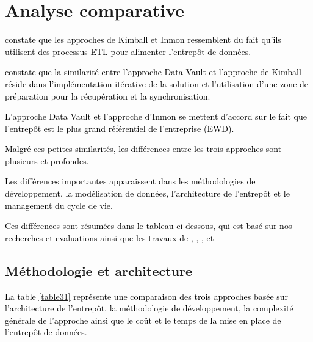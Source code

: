 \documentclass[a4paper,12pt]{report}
\begin{document}
\section{Analyse comparative}
\textcolor{black}{\citep{breslin2004data} constate que les approches de Kimball et Inmon ressemblent du fait qu’ils utilisent des processus ETL pour alimenter l’entrepôt de données.}

\textcolor{black}{\citep{12}constate que la similarité entre l’approche Data Vault et l’approche de Kimball réside dans l’implémentation itérative de la solution et l’utilisation d’une zone de préparation pour la récupération et la synchronisation.}

\textcolor{black}{L’approche Data Vault et l’approche d’Inmon se mettent d’accord sur le fait que l’entrepôt est le plus grand référentiel de l’entreprise (EWD).}

\textcolor{black}{Malgré ces petites similarités, les différences entre les trois approches sont plusieurs et profondes.}

\textcolor{black}{Les différences importantes apparaissent dans les méthodologies de développement, la modélisation de données, l’architecture de l’entrepôt et le management du cycle de vie.}

\textcolor{black}{Ces différences sont résumées dans le tableau ci-dessous, qui est basé sur nos recherches et evaluations ainsi que les travaux de \citep{breslin2004data}, \citep{weir2008}, \citep{schneider2014com}, \citep{schalk14} et \citep{13} }
 \subsection{Méthodologie et architecture}
 \textcolor{black}{La table \ref{table31} représente une comparaison des trois approches  basée sur l'architecture de l'entrepôt, la méthodologie de développement, la complexité générale de l'approche ainsi que le coût et le temps de la mise en place de l'entrepôt de données.}
\end{document}
